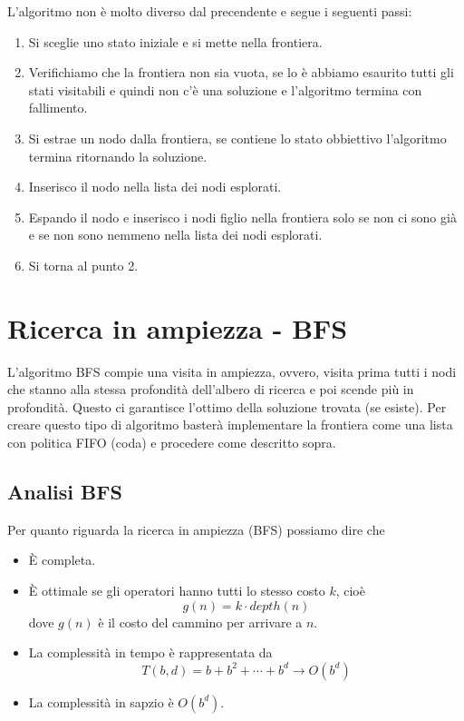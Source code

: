 L'algoritmo non \`e molto diverso dal precendente e segue i seguenti passi:
\begin{enumerate}
	\item Si sceglie uno stato iniziale e si mette nella frontiera.
	\item Verifichiamo che la frontiera non sia vuota, se lo \`e abbiamo esaurito tutti gli
	      stati visitabili e quindi non c'\`e una soluzione e l'algoritmo termina con
	      fallimento.
	\item Si estrae un nodo dalla frontiera, se contiene lo stato obbiettivo l'algoritmo
	      termina ritornando la soluzione.
	\item Inserisco il nodo nella lista dei nodi esplorati.
	\item Espando il nodo e inserisco i nodi figlio nella frontiera solo se non ci sono gi\`a
	      e se non sono nemmeno nella lista dei nodi esplorati.
	\item Si torna al punto 2.
\end{enumerate}

\section{Ricerca in ampiezza - BFS}
L'algoritmo BFS compie una visita in ampiezza, ovvero, visita prima tutti i nodi che stanno
alla stessa profondit\`a dell'albero di ricerca e poi scende pi\`u in profondit\`a.
Questo ci garantisce l'ottimo della soluzione trovata (se esiste). Per creare questo
tipo di algoritmo baster\`a implementare la frontiera come una lista con politica FIFO
(coda) e procedere come descritto sopra.

\subsection{Analisi BFS}
Per quanto riguarda la ricerca in ampiezza (BFS) possiamo dire che
\begin{itemize}
	\item \`E completa.
	\item \`E ottimale se gli operatori hanno tutti lo stesso costo $k$, cio\`e
	      \[ g(n) = k \cdot depth(n) \]
	      dove $g(n)$ \`e il costo del cammino per arrivare a $n$.
	\item La complessit\`a in tempo \`e rappresentata da
	      \[ T(b, d) = b + b^2 + \cdots + b^d \rightarrow O(b^d) \]
	\item La complessit\`a in sapzio \`e $O(b^d)$.
\end{itemize}

